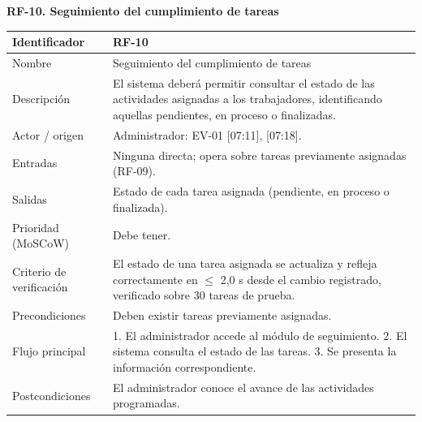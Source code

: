 \documentclass[12pt,a4paper]{article}
\begin{document}
\begin{minipage}{\linewidth}
\bigskip
\noindent\textbf{RF-10. Seguimiento del cumplimiento de tareas}
\label{tab:RF-10}

\begin{center}
\begin{tabular}{|p{3.5cm}|p{10.7cm}|}
\hline
Identificador & RF-10 \\
\hline
Nombre & Seguimiento del cumplimiento de tareas \\
\hline
Descripción & El sistema deberá permitir consultar el estado de las actividades asignadas a los trabajadores, identificando aquellas pendientes, en proceso o finalizadas. \\
\hline
Actor / origen & Administrador: EV-01 [07:11], [07:18]. \\
\hline
Entradas & Ninguna directa; opera sobre tareas previamente asignadas (RF-09). \\
\hline
Salidas & Estado de cada tarea asignada (pendiente, en proceso o finalizada). \\
\hline
Prioridad (MoSCoW) & Debe tener. \\
\hline
Criterio de verificación & El estado de una tarea asignada se actualiza y refleja correctamente en $\leq$ 2,0 s desde el cambio registrado, verificado sobre 30 tareas de prueba. \\
\hline
Precondiciones & Deben existir tareas previamente asignadas. \\
\hline
Flujo principal & 1. El administrador accede al módulo de seguimiento. 2. El sistema consulta el estado de las tareas. 3. Se presenta la información correspondiente. \\
\hline
Postcondiciones & El administrador conoce el avance de las actividades programadas. \\
\hline
\end{tabular}
\end{center}
\end{minipage}
\end{document}
